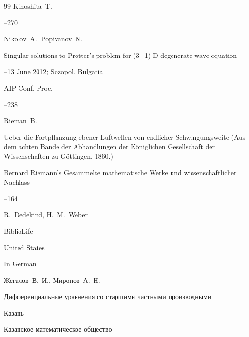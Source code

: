 \begin{thebibliography}{99}
\by Kinoshita~T.




--270







\by Nikolov~A., Popivanov~N.

\paper Singular solutions to Protter's problem for (3+1)-D degenerate wave equation

–13 June 2012; Sozopol, Bulgaria

\serial AIP Conf. Proc.



--238






\by Rieman~B.

\paper Ueber die Fortpflanzung ebener Luftwellen von endlicher Schwingungsweite (Aus dem achten Bande der Abhandlungen der K\"oniglichen Gesellschaft der Wissenschaften zu G\"ottingen. 1860.)

\inbook Bernard Riemann's Gesammelte mathematische Werke und wissenschaftlicher Nachlass


--164

\eds R.~Dedekind, H.~M.~Weber

\publ BiblioLife

\publaddr United States

\lang In German





\by Жегалов~В.~И., Миронов~А.~Н. 

\book Дифференциальные уравнения со старшими частными производными 

\publaddr Казань

\publ Казанское математическое общество 


\end{thebibliography}
